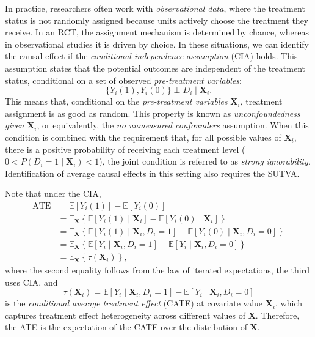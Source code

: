 In practice, researchers often work with \textit{observational data}, where the treatment status is not randomly assigned because units actively choose the treatment they receive. In an RCT, the assignment mechanism is determined by chance, whereas in observational studies it is driven by choice. In these situations, we can identify the causal effect if the \textit{conditional independence assumption} (CIA) holds. This assumption states that the potential outcomes are independent of the treatment status, conditional on a set of observed  \textit{pre-treatment variables}:
\[
\{ Y_i(1), Y_i(0) \} \perp D_i \mid \mathbf{X}_i.
\]
This means that, conditional on the \textit{pre-treatment variables} $\mathbf{X}_i$, treatment assignment is as good as random. This property is known as \textit{unconfoundedness given} $\mathbf{X}_i$, or equivalently, the \textit{no unmeasured confounders} assumption. When this condition is combined with the requirement that, for all possible values of $\mathbf{X}_i$, there is a positive probability of receiving each treatment level ($0 < P(D_i = 1 \mid \mathbf{X}_i) < 1$), the joint condition is referred to as \textit{strong ignorability}. Identification of average causal effects in this setting also requires the SUTVA.

Note that under the CIA,
\begin{align*}
	\text{ATE} &= \mathbb{E}[Y_i(1)] - \mathbb{E}[Y_i(0)] \\
	&= \mathbb{E}_{\mathbf{X}}\left\{ \mathbb{E}[Y_i(1)\mid \mathbf{X}_i] - \mathbb{E}[Y_i(0)\mid \mathbf{X}_i] \right\} \\
	&= \mathbb{E}_{\mathbf{X}}\left\{ \mathbb{E}[Y_i(1)\mid \mathbf{X}_i, D_i=1] - \mathbb{E}[Y_i(0)\mid \mathbf{X}_i, D_i=0] \right\} \\
	&= \mathbb{E}_{\mathbf{X}}\left\{ \mathbb{E}[Y_i\mid \mathbf{X}_i, D_i=1] - \mathbb{E}[Y_i\mid \mathbf{X}_i, D_i=0] \right\} \\
	&= \mathbb{E}_{\mathbf{X}}\left\{ \tau(\mathbf{X}_i) \right\},
\end{align*}
where the second equality follows from the law of iterated expectations, the third uses CIA, and
\[
\tau(\mathbf{X}_i) = \mathbb{E}[Y_i \mid \mathbf{X}_i, D_i=1] - \mathbb{E}[Y_i \mid \mathbf{X}_i, D_i=0]
\]
is the \textit{conditional average treatment effect} (CATE) at covariate value $\mathbf{X}_i$, which captures treatment effect heterogeneity across different values of $\mathbf{X}$. Therefore, the ATE is the expectation of the CATE over the distribution of $\mathbf{X}$.

